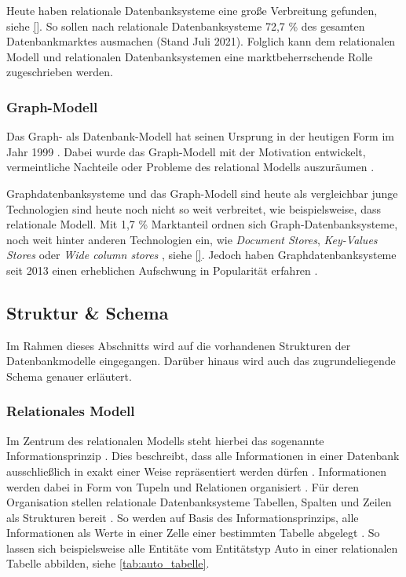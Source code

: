 Heute haben relationale Datenbanksysteme eine große Verbreitung gefunden, siehe \autoref{}. So sollen nach \cite{db_engines_ranking_july} relationale Datenbanksysteme 72,7 \% des gesamten Datenbankmarktes ausmachen (Stand Juli 2021). Folglich kann dem relationalen Modell und relationalen Datenbanksystemen eine marktbeherrschende Rolle zugeschrieben werden.


\subsubsection{Graph-Modell}
Das Graph- als Datenbank-Modell hat seinen Ursprung in der heutigen Form im Jahr 1999 \cite{gdbms}. Dabei wurde das Graph-Modell mit der Motivation entwickelt, vermeintliche Nachteile oder Probleme des relational Modells auszuräumen \cite{gdbms}.

Graphdatenbanksysteme und das Graph-Modell sind heute als vergleichbar junge Technologien sind heute noch nicht so weit verbreitet, wie beispielsweise, dass relationale Modell. Mit 1,7 \% Marktanteil ordnen sich Graph-Datenbanksysteme, noch weit hinter anderen Technologien ein, wie \textit{Document Stores}, \textit{Key-Values Stores} oder \textit{Wide column stores} \cite{db_engines_ranking_july}, siehe \autoref{}. Jedoch haben Graphdatenbanksysteme seit 2013 einen erheblichen Aufschwung in Popularität erfahren \cite{db_engines_ranking_july}. 

\subsection{Struktur \& Schema}
\label{datenmodelle:structure}
Im Rahmen dieses Abschnitts wird auf die vorhandenen Strukturen der Datenbankmodelle eingegangen. Darüber hinaus wird auch das zugrundeliegende Schema genauer erläutert. 

\subsubsection{Relationales Modell}
\label{datenmodelle:structure:relational}
Im Zentrum des relationalen Modells steht hierbei das sogenannte Informationsprinzip \cite{rdbms_history}. Dies beschreibt, dass alle Informationen in einer Datenbank ausschließlich in exakt einer Weise repräsentiert werden dürfen \cite{codd_relational_model}. Informationen werden dabei in Form von Tupeln und Relationen organisiert \cite{codd_relational_model}. Für deren Organisation stellen relationale Datenbanksysteme Tabellen, Spalten und Zeilen als Strukturen bereit \cite{rdbms_history}. So werden auf Basis des Informationsprinzips, alle Informationen als Werte in einer Zelle einer bestimmten Tabelle abgelegt \cite{rdbms_history}. So lassen sich beispielsweise alle Entitäte  vom Entitätstyp Auto in einer relationalen Tabelle abbilden, siehe \autoref{tab:auto_tabelle}. 

